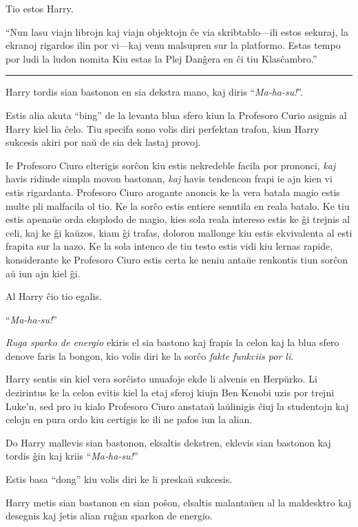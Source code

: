 Tio estos Harry.

``Nun lasu viajn librojn kaj viajn objektojn ĉe via skribtablo—ili
estos sekuraj, la ekranoj rigardos ilin por vi—kaj venu malsupren sur
la platformo. Estas tempo por ludi la ludon nomita Kiu estas la Plej
Danĝera en ĉi tiu Klasĉambro.''

\begin{center}\rule{3in}{0.4pt}\end{center}

Harry tordis sian bastonon en sia dekstra mano, kaj diris ``\emph{Ma-ha-su!}''.

Estis alia akuta ``bing'' de la levanta blua sfero kiun la Profesoro
Curio asignis al Harry kiel lia ĉelo. Tiu specifa sono volis diri
perfektan trafon, kiun Harry sukcesis akiri por naŭ de sia dek lastaj
provoj.

Ie Profesoro Ciuro elterigis sorĉon kiu estis nekredeble facila por
prononci, \emph{kaj} havis ridinde simpla movon bastonan, \emph{kaj}
havis tendencon frapi ie ajn kien vi estis rigardanta. Profesoro Ciuro
arogante anoncis ke la vera batala magio estis multe pli malfacila ol
tio. Ke la sorĉo estis entiere senutila en reala batalo. Ke tiu estis
apenaŭe orda eksplodo de magio, kies sola reala intereso estis ke ĝi
trejnis al celi, kaj ke ĝi kaŭzos, kiam ĝi trafas, doloron mallonge
kiu estis ekvivalenta al esti frapita sur la nazo. Ke la sola intenco
de tiu testo estis vidi kiu lernas rapide, konsiderante ke Profesoro
Ciuro estis certa ke neniu antaŭe renkontis tiun sorĉon aŭ iun ajn
kiel ĝi.

Al Harry ĉio tio egalis.

``\emph{Ma-ha-su!}''

\emph{Ruga sparko de energio} ekiris el sia bastono kaj frapis la
celon kaj la blua sfero denove faris la bongon, kio volis diri ke la
sorĉo \emph{fakte funkciis por li}.

Harry sentis sin kiel vera sorĉisto unuafoje ekde li alvenis en
Herpŭrko. Li dezirintus ke la celon evitis kiel la etaj sferoj kiujn
Ben Kenobi uzis por trejni Luke'n, sed pro iu kialo Profesoro Ciuro
anstataŭ laŭlinigis ĉiuj la studentojn kaj celojn en pura ordo kiu
certigis ke ili ne pafos iun la alian.

Do Harry mallevis sian bastonon, eksaltis dekstren, eklevis sian
bastonon kaj tordis ĝin kaj kriis ``\emph{Ma-ha-su!}''

Estis basa ``dong'' kiu volis diri ke li preskaŭ sukcesis.

Harry metis sian bastanon en sian poŝon, elsaltis malantaŭen al la
maldesktro kaj desegnis kaj ĵetis alian ruĝan sparkon de energio.

